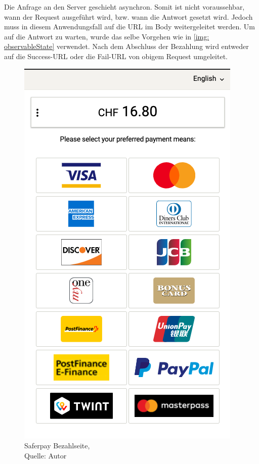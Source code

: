 Die Anfrage an den Server geschieht asynchron. Somit ist nicht voraussehbar, wann der Request ausgeführt wird, bzw. wann die Antwort gesetzt wird. Jedoch muss in diesem Anwendungsfall auf die URL im Body weitergeleitet werden. Um auf die Antwort zu warten, wurde das selbe Vorgehen wie in \ref{img: observableState} verwendet. 
Nach dem Abschluss der Bezahlung wird entweder auf die Success-URL oder die Fail-URL von obigem Request umgeleitet. 
\begin{figure}[H]
	\centering
	\includegraphics[scale=0.3]{images/paymentSaferpay.PNG}
	\caption[Saferpay Bezahlseite]{Saferpay Bezahlseite,\\ Quelle: Autor}
	\label{img: paymentSaferpay}
\end{figure} 

